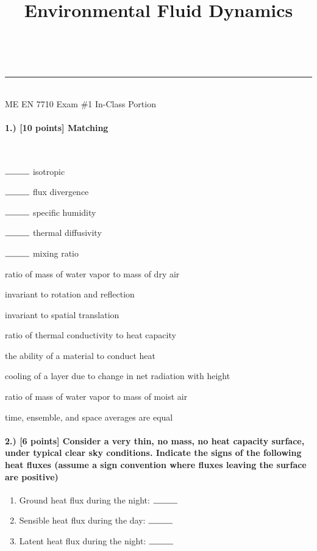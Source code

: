\documentclass[11pt]{article}
\makeatletter
\newcommand{\linia}{\rule{\linewidth}{0.5pt}}
\renewcommand{\maketitle}{
\begin{center}
\vspace{2ex}
{\huge \textsc{\@title}}
\vspace{1ex}
\\
\linia\\
ME EN 7710 \hfill Exam \#1 \hfill In-Class Portion
\vspace{4ex}
\end{center}
}
\makeatother
\begin{document}
\title{Environmental Fluid Dynamics}

\maketitle

\vspace{-20pt}
\paragraph{1.) [10 points] Matching}~\\
\begin{enumerate}
	\begin{minipage}{0.4\linewidth}
    \item[] $\rule{1cm}{0.15mm}$ isotropic
    \item[] $\rule{1cm}{0.15mm}$ flux divergence
    \item[] $\rule{1cm}{0.15mm}$ specific humidity
    \item[] $\rule{1cm}{0.15mm}$ thermal diffusivity
    \item[] $\rule{1cm}{0.15mm}$ mixing ratio
	\end{minipage}
	\begin{minipage}{0.6\linewidth}
    \item ratio of mass of water vapor to mass of dry air
    \item invariant to rotation and reflection
    \item invariant to spatial translation
    \item ratio of thermal conductivity to heat capacity
    \item the ability of a material to conduct heat
    \item cooling of a layer due to change in net radiation with height
    \item ratio of mass of water vapor to mass of moist air
    \item time, ensemble, and space averages are equal
	\end{minipage}
\end{enumerate}

\paragraph{2.) [6 points] Consider a very thin, no mass, no heat capacity surface, under typical clear sky conditions. Indicate the signs of the following heat fluxes (assume a sign convention where fluxes leaving the surface are positive)}
\begin{enumerate}[label=\alph*.)]
	\item Ground heat flux during the night:\tabto{6cm} $\rule{1cm}{0.15mm}$
	\item Sensible heat flux during the day:\tabto{6cm} $\rule{1cm}{0.15mm}$
	\item Latent heat flux during the night:\tabto{6cm} $\rule{1cm}{0.15mm}$
\end{enumerate}
\end{document}

